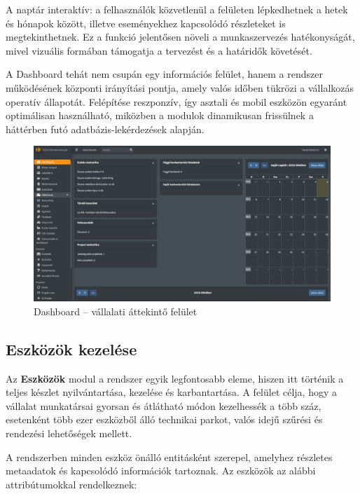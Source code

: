 A naptár interaktív: a felhasználók közvetlenül a felületen lépkedhetnek a hetek és hónapok között, 
illetve eseményekhez kapcsolódó részleteket is megtekinthetnek.  
Ez a funkció jelentősen növeli a munkaszervezés hatékonyságát, mivel vizuális formában támogatja a tervezést és a határidők követését.

A Dashboard tehát nem csupán egy információs felület, hanem a rendszer működésének központi irányítási pontja, 
amely valós időben tükrözi a vállalkozás operatív állapotát.  
Felépítése reszponzív, így asztali és mobil eszközön egyaránt optimálisan használható, 
miközben a modulok dinamikusan frissülnek a háttérben futó adatbázis-lekérdezések alapján.

\begin{figure}[H]
	\centering
    \includegraphics[width=150mm, keepaspectratio]{figures/dashboard.jpg}
    \caption{Dashboard – vállalati áttekintő felület}
    \label{fig:dashboard}
\end{figure}

\subsection{Eszközök kezelése}

Az \textbf{Eszközök} modul a rendszer egyik legfontosabb eleme, hiszen itt történik a teljes készlet nyilvántartása, kezelése és karbantartása.  
A felület célja, hogy a vállalat munkatársai gyorsan és átlátható módon kezelhessék a több száz, esetenként több ezer eszközből álló technikai parkot, 
valós idejű szűrési és rendezési lehetőségek mellett.

A rendszerben minden eszköz önálló entitásként szerepel, amelyhez részletes metaadatok és kapcsolódó információk tartoznak.  
Az eszközök az alábbi attribútumokkal rendelkeznek:

